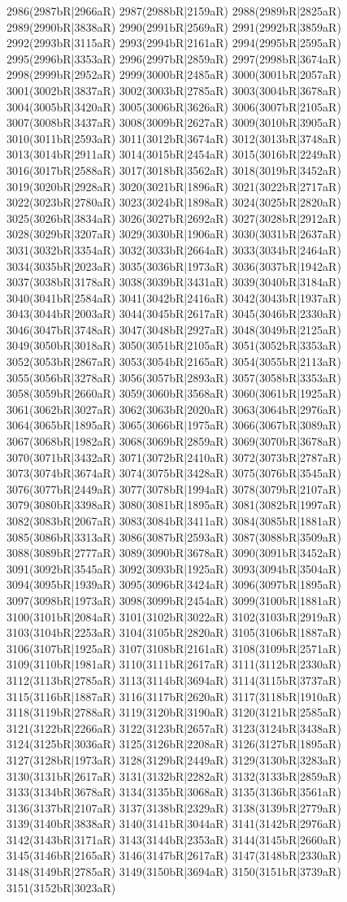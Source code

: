 2986(2987bR|2966aR) 2987(2988bR|2159aR) 2988(2989bR|2825aR) 2989(2990bR|3838aR) 2990(2991bR|2569aR) 2991(2992bR|3859aR) 2992(2993bR|3115aR) 2993(2994bR|2161aR) 2994(2995bR|2595aR) 2995(2996bR|3353aR) 2996(2997bR|2859aR) 2997(2998bR|3674aR) 2998(2999bR|2952aR) 2999(3000bR|2485aR) 3000(3001bR|2057aR) 3001(3002bR|3837aR) 3002(3003bR|2785aR) 3003(3004bR|3678aR) 3004(3005bR|3420aR) 3005(3006bR|3626aR) 3006(3007bR|2105aR) 3007(3008bR|3437aR) 3008(3009bR|2627aR) 3009(3010bR|3905aR) 3010(3011bR|2593aR) 3011(3012bR|3674aR) 3012(3013bR|3748aR) 3013(3014bR|2911aR) 3014(3015bR|2454aR) 3015(3016bR|2249aR) 3016(3017bR|2588aR) 3017(3018bR|3562aR) 3018(3019bR|3452aR) 3019(3020bR|2928aR) 3020(3021bR|1896aR) 3021(3022bR|2717aR) 3022(3023bR|2780aR) 3023(3024bR|1898aR) 3024(3025bR|2820aR) 3025(3026bR|3834aR) 3026(3027bR|2692aR) 3027(3028bR|2912aR) 3028(3029bR|3207aR) 3029(3030bR|1906aR) 3030(3031bR|2637aR) 3031(3032bR|3354aR) 3032(3033bR|2664aR) 3033(3034bR|2464aR) 3034(3035bR|2023aR) 3035(3036bR|1973aR) 3036(3037bR|1942aR) 3037(3038bR|3178aR) 3038(3039bR|3431aR) 3039(3040bR|3184aR) 3040(3041bR|2584aR) 3041(3042bR|2416aR) 3042(3043bR|1937aR) 3043(3044bR|2003aR) 3044(3045bR|2617aR) 3045(3046bR|2330aR) 3046(3047bR|3748aR) 3047(3048bR|2927aR) 3048(3049bR|2125aR) 3049(3050bR|3018aR) 3050(3051bR|2105aR) 3051(3052bR|3353aR) 3052(3053bR|2867aR) 3053(3054bR|2165aR) 3054(3055bR|2113aR) 3055(3056bR|3278aR) 3056(3057bR|2893aR) 3057(3058bR|3353aR) 3058(3059bR|2660aR) 3059(3060bR|3568aR) 3060(3061bR|1925aR) 3061(3062bR|3027aR) 3062(3063bR|2020aR) 3063(3064bR|2976aR) 3064(3065bR|1895aR) 3065(3066bR|1975aR) 3066(3067bR|3089aR) 3067(3068bR|1982aR) 3068(3069bR|2859aR) 3069(3070bR|3678aR) 3070(3071bR|3432aR) 3071(3072bR|2410aR) 3072(3073bR|2787aR) 3073(3074bR|3674aR) 3074(3075bR|3428aR) 3075(3076bR|3545aR) 3076(3077bR|2449aR) 3077(3078bR|1994aR) 3078(3079bR|2107aR) 3079(3080bR|3398aR) 3080(3081bR|1895aR) 3081(3082bR|1997aR) 3082(3083bR|2067aR) 3083(3084bR|3411aR) 3084(3085bR|1881aR) 3085(3086bR|3313aR) 3086(3087bR|2593aR) 3087(3088bR|3509aR) 3088(3089bR|2777aR) 3089(3090bR|3678aR) 3090(3091bR|3452aR) 3091(3092bR|3545aR) 3092(3093bR|1925aR) 3093(3094bR|3504aR) 3094(3095bR|1939aR) 3095(3096bR|3424aR) 3096(3097bR|1895aR) 3097(3098bR|1973aR) 3098(3099bR|2454aR) 3099(3100bR|1881aR) 3100(3101bR|2084aR) 3101(3102bR|3022aR) 3102(3103bR|2919aR) 3103(3104bR|2253aR) 3104(3105bR|2820aR) 3105(3106bR|1887aR) 3106(3107bR|1925aR) 3107(3108bR|2161aR) 3108(3109bR|2571aR) 3109(3110bR|1981aR) 3110(3111bR|2617aR) 3111(3112bR|2330aR) 3112(3113bR|2785aR) 3113(3114bR|3694aR) 3114(3115bR|3737aR) 3115(3116bR|1887aR) 3116(3117bR|2620aR) 3117(3118bR|1910aR) 3118(3119bR|2788aR) 3119(3120bR|3190aR) 3120(3121bR|2585aR) 3121(3122bR|2266aR) 3122(3123bR|2657aR) 3123(3124bR|3438aR) 3124(3125bR|3036aR) 3125(3126bR|2208aR) 3126(3127bR|1895aR) 3127(3128bR|1973aR) 3128(3129bR|2449aR) 3129(3130bR|3283aR) 3130(3131bR|2617aR) 3131(3132bR|2282aR) 3132(3133bR|2859aR) 3133(3134bR|3678aR) 3134(3135bR|3068aR) 3135(3136bR|3561aR) 3136(3137bR|2107aR) 3137(3138bR|2329aR) 3138(3139bR|2779aR) 3139(3140bR|3838aR) 3140(3141bR|3044aR) 3141(3142bR|2976aR) 3142(3143bR|3171aR) 3143(3144bR|2353aR) 3144(3145bR|2660aR) 3145(3146bR|2165aR) 3146(3147bR|2617aR) 3147(3148bR|2330aR) 3148(3149bR|2785aR) 3149(3150bR|3694aR) 3150(3151bR|3739aR) 3151(3152bR|3023aR) 